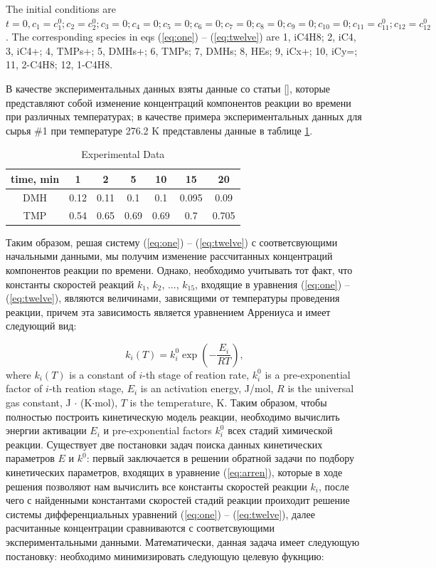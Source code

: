 \documentclass{svproc}
\begin{document}
The initial conditions are $t = 0, c_1 = c_1^0; c_2=c_2^0; c_3 = 0; c_4 = 0; c_5= 0; c_6 = 0; c_7 = 0; c_8 = 0; c_9 = 0; c_{10} = 0; c_{11}=c_{11}^0; c_{12} = c_{12}^0$.
The corresponding species in eqs (\ref{eq:one}) -- (\ref{eq:twelve}) are 1, iC4H8; 2, iC4, 3, iC4+; 4, TMPs+; 5, DMHs+; 6, TMPs; 7, DMHs; 8, HEs; 9, iCx+; 10, iCy=; 11, 2-C4H8; 12, 1-C4H8.

В качестве экспериментальных данных взяты данные со статьи [], которые представляют собой изменение концентраций компонентов реакции во времени при различных температурах; в качестве примера экспериментальных данных для сырья \#1 при температуре 276.2 K представлены данные в таблице \ref{table1}.
\begin{table}
\label{table1}
\caption{Experimental Data}
\begin{center}
\begin{tabular}{ccccccc}
\hline
time, min & 1 & 2 & 5 & 10 & 15 & 20 \\
\hline\rule{0pt}{12pt}
DMH & 0.12 & 0.11 & 0.1	& 0.1 &	0.095 &	0.09  \\
TMP & 0.54 & 0.65 & 0.69 & 0.69 & 0.7 & 0.705 \\[2pt]
\hline
\end{tabular}
\end{center}
\end{table}

Таким образом, решая систему (\ref{eq:one}) -- (\ref{eq:twelve}) с соответсвующими начальными данными, мы получим изменение рассчитанных концентраций компонентов реакции по времени. Однако, необходимо учитывать тот факт, что константы скоростей реакций $k_1$, $k_2$, ..., $k_{15}$, входящие в уравнения (\ref{eq:one}) -- (\ref{eq:twelve}), являются величинами, зависящими от температуры проведения реакции, причем эта зависимость является уравнением Аррениуса и имеет следующий вид:

\begin{equation}
  k_i (T) = k_i^0 \exp \left(- \dfrac{E_i}{RT} \right),
  \label{eq:arren}
\end{equation}
where $k_i(T)$ is a constant of $i$-th stage of reation rate, $k_i^0$ is a pre-exponential factor of $i$-th reation stage, $E_i$ is an activation energy, J/mol, $R$ is the universal gas constant, J $\cdot$ (K$\cdot$mol), $T$ is the temperature, K. Таким образом, чтобы полностью построить кинетическую модель реакции, необходимо вычислить энергии активации $E_i$ и pre-exponential factors $k_i^0$ всех стадий химической реакции. Существует две постановки задач поиска данных кинетических параметров $E$ и $k^0$: первый заключается в решении обратной задачи по подбору кинетических параметров, входящих в уравнение (\ref{eq:arren}), которые в ходе решения позволяют нам вычислить все константы скоростей реакции $k_i$, после чего с найденными константами скоростей стадий реакции проиходит решение системы дифференциальных уравнений (\ref{eq:one}) -- (\ref{eq:twelve}), далее расчитанные концентрации сравниваются с соответсвующими экспериментальными данными. Математически, данная задача имеет следующую постановку: необходимо минимизировать следующую целевую фукнцию:
\end{document}
